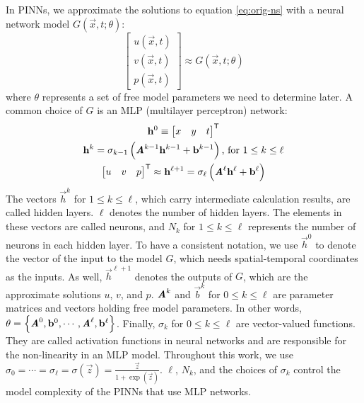 In PINNs, we approximate the solutions to equation \eqref{eq:orig-ns} with a neural network model $G(\vec{x}, t; \theta)$:
\begin{equation}\label{eq:G-network}
    \begin{bmatrix}
        u(\vec{x}, t) \\ v(\vec{x}, t) \\ p(\vec{x}, t)
    \end{bmatrix}
    \approx
    G(\vec{x}, t; \theta)
\end{equation}
where $\theta$ represents a set of free model parameters we need to determine later.
A common choice of $G$ is an MLP (multilayer perceptron) network:
\begin{gather}\label{eq:mlp-formula}
    \mathbf{h}^0 \equiv \begin{bmatrix} x & y & t \end{bmatrix}^\mathsf{T} \\
    \mathbf{h}^k =
        \sigma_{k-1}\left(\boldsymbol{\mathit{A}}^{k-1}\mathbf{h}^{k-1}+\mathbf{b}^{k-1}\right)
        \text{, for } 1 \le k \le \ell \\
    \begin{bmatrix} u & v & p \end{bmatrix}^\mathsf{T}
        \approx
        \mathbf{h}^{\ell+1} = \sigma_\ell\left(\boldsymbol{\mathit{A}}^\ell\mathbf{h}^\ell+\mathbf{b}^\ell\right)
\end{gather}
The vectors $\vec{h}^k$ for $1 \le k \le \ell$, which carry intermediate calculation results, are called hidden layers.
$\ell$ denotes the number of hidden layers.
The elements in these vectors are called neurons, and $N_k$ for $1 \le k \le \ell$ represents the number of neurons in each hidden layer.
To have a consistent notation, we use $\vec{h}^0$ to denote the vector of the input to the model $G$, which needs spatial-temporal coordinates as the inputs.
As well, $\vec{h}^{\ell+1}$ denotes the outputs of $G$, which are the approximate solutions $u$, $v$, and $p$. 
$\boldsymbol{\mathit{A}}^k$ and $\vec{b}^k$ for $0 \le k \le \ell$ are parameter matrices and vectors holding free model parameters.
In other words, $\theta = \left\{ \boldsymbol{\mathit{A}}^0, \mathbf{b}^0, \cdots, \boldsymbol{\mathit{A}}^\ell, \mathbf{b}^\ell\right\}$.
Finally, $\sigma_k$ for $0 \le k \le \ell$ are vector-valued functions.
They are called activation functions in neural networks and are responsible for the non-linearity in an MLP model.
Throughout this work, we use $\sigma_0 = \cdots = \sigma_\ell = \sigma(\vec{z}) = \frac{\vec{z}}{1 + \exp(\vec{z})}$.
$\ell$, $N_k$, and the choices of $\sigma_k$ control the model complexity of the PINNs that use MLP networks.

